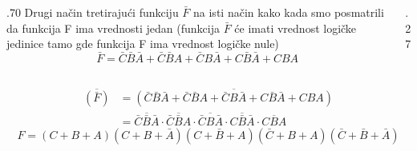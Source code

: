 \begin{frame}[label=02-s016]
\gusttekst
\begin{columns}[c,onlytextwidth]
\begin{column}{.70\textwidth}
\alert{Drugi način} tretirajući funkciju \(\bar F\) na isti način kako kada smo posmatrili da funkcija F ima vrednosti jedan (funkcija \(\bar F\) će imati vrednost logičke jedinice tamo gde funkcija F ima vrednost logičke nule)
\[
\bar F=\bar C\bar B\bar A+\bar C\bar BA+\bar CB\bar A+C\bar B\bar A+CBA
\]
\end{column}
\begin{column}{.27\textwidth}

\end{column}
\end{columns}
\[
\begin{aligned}
\overline{(\bar F)}
&=\overline{(\bar C\bar B\bar A+\bar C\bar BA+\bar CB\bar A+C\bar B\bar A+CBA)}\\
&=\overline{\bar C\bar B\bar A}\cdot\overline{\bar C\bar BA}\cdot
\overline{\bar CB\bar A}\cdot\overline{C\bar B\bar A}\cdot\overline{CBA}
\end{aligned}
\]
\[
F=(C+B+A)(C+B+\bar A)(C+\bar B+A)(\bar C+B+A)(\bar C+\bar B+\bar A)
\]
\end{frame}
